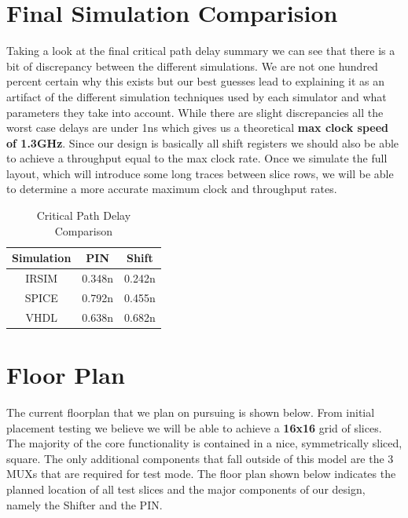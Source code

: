 \newpage
\section{Final Simulation Comparision}

    Taking a look at the final critical path delay summary we can see that
    there is a bit of discrepancy between the different simulations. We are not
    one hundred percent certain why this exists but our best guesses lead to
    explaining it as an artifact of the different simulation techniques used by
    each simulator and what parameters they take into account. While there are
    slight discrepancies all the worst case delays are under 1ns which gives us
    a theoretical \textbf{max clock speed of 1.3GHz}. Since our design is
    basically all shift registers we should also be able to achieve a
    throughput equal to the max clock rate. Once we simulate the full layout,
    which will introduce some long traces between slice rows, we will be able
    to determine a more accurate maximum clock and throughput rates.

    \vspace{\baselineskip}

    \begin{table}[H]
        \centering
        \begin{tabular}{ccc}
            \toprule
            \textbf{Simulation} & \textbf{PIN} & \textbf{Shift} \\
            \midrule
            IRSIM & 0.348n & 0.242n \\
            SPICE & 0.792n & 0.455n \\
            VHDL  & 0.638n & 0.682n \\
            \bottomrule
        \end{tabular}
        \caption{Critical Path Delay Comparison}
    \end{table}

\newpage
\section{Floor Plan}

    The current floorplan that we plan on pursuing is shown below. From initial
    placement testing we believe we will be able to achieve a \textbf{16x16}
    grid of slices. The majority of the core functionality is contained in a
    nice, symmetrically sliced, square. The only additional components that
    fall outside of this model are the 3 MUXs that are required for test mode.
    The floor plan shown below indicates the planned location of all test
    slices and the major components of our design, namely the Shifter and the
    PIN.
    \vspace{\baselineskip}

